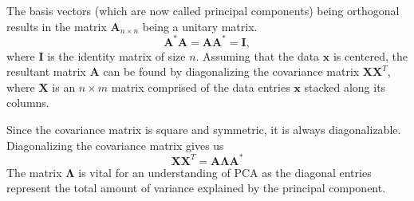 \documentclass[10pt,onecolumn]{article}
\begin{document}
    The basis vectors (which are now called principal components) being orthogonal results in the matrix $\mathbf{A}_{n\times n}$ being a unitary matrix.
    \begin{equation}
        \mathbf{A}^*\mathbf{A} = \mathbf{A}\mathbf{A}^* = \mathbf{I},
        \label{eqn:matrix_orthonormality}
    \end{equation}
    where $\mathbf{I}$ is the identity matrix of size $n$.
    Assuming that the data $\mathbf{x}$ is centered, the resultant matrix $\mathbf{A}$ can be found by diagonalizing the covariance matrix $\mathbf{X}\mathbf{X}^T$, where $\mathbf{X}$ is an $n\times{m}$ matrix comprised of the data entries $\mathbf{x}$ stacked along its columns.

    Since the covariance matrix is square and symmetric, it is always diagonalizable.
    Diagonalizing the covariance matrix gives us
    \begin{equation}
        \mathbf{X}\mathbf{X}^T = \mathbf{A}\mathbf{\Lambda} \mathbf{A}^*
        \label{eqn:matrix_diagonalization}
    \end{equation}
    The matrix $\mathbf{\Lambda}$ is vital for an understanding of \ac{PCA} as the diagonal entries represent the total amount of variance explained by the principal component.
\end{document}

